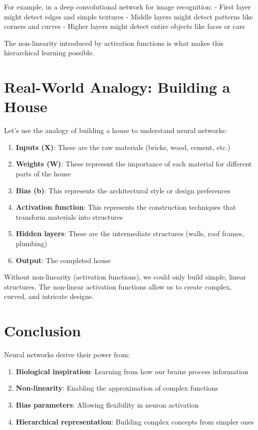 \documentclass[
  letterpaper,
  DIV=11,
  numbers=noendperiod]{scrreprt}
\providecommand{\tightlist}{%
  \setlength{\itemsep}{0pt}\setlength{\parskip}{0pt}}\usepackage{longtable,booktabs,array}
\begin{document}
For example, in a deep convolutional network for image recognition: -
First layer might detect edges and simple textures - Middle layers might
detect patterns like corners and curves - Higher layers might detect
entire objects like faces or cars

The non-linearity introduced by activation functions is what makes this
hierarchical learning possible.

\section{Real-World Analogy: Building a
House}\label{real-world-analogy-building-a-house}

Let's use the analogy of building a house to understand neural networks:

\begin{enumerate}
\def\labelenumi{\arabic{enumi}.}
\tightlist
\item
  \textbf{Inputs (X)}: These are the raw materials (bricks, wood,
  cement, etc.)
\item
  \textbf{Weights (W)}: These represent the importance of each material
  for different parts of the house
\item
  \textbf{Bias (b)}: This represents the architectural style or design
  preferences
\item
  \textbf{Activation function}: This represents the construction
  techniques that transform materials into structures
\item
  \textbf{Hidden layers}: These are the intermediate structures (walls,
  roof frames, plumbing)
\item
  \textbf{Output}: The completed house
\end{enumerate}

Without non-linearity (activation functions), we could only build
simple, linear structures. The non-linear activation functions allow us
to create complex, curved, and intricate designs.

\section{Conclusion}\label{conclusion-3}

Neural networks derive their power from:

\begin{enumerate}
\def\labelenumi{\arabic{enumi}.}
\tightlist
\item
  \textbf{Biological inspiration}: Learning from how our brains process
  information
\item
  \textbf{Non-linearity}: Enabling the approximation of complex
  functions
\item
  \textbf{Bias parameters}: Allowing flexibility in neuron activation
\item
  \textbf{Hierarchical representation}: Building complex concepts from
  simpler ones
\end{enumerate}
\end{document}
